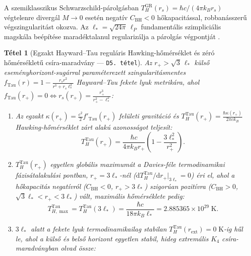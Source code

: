 \documentclass[11pt,a4paper]{article}
\newtheorem{theorem}{T\'etel}[section]
\theoremstyle{remark}
\begin{document}
A szemiklasszikus Schwarzschild-p\'arolg\'asban $T_H^{\mathrm{GR}}(r_s) = \hbar c/(4\pi k_B r_s)$ v\'egtelenre diverg\'al $M \to 0$ eset\'en negat\'iv $C_{\mathrm{BH}} < 0$ h\H{o}kapacit\'assal, robban\'asszer\H{u} v\'egszingularit\'ast okozva. Az $\ell_* = \sqrt{24\pi}\,\ell_P$ fundament\'alis szimplici\'alis magsk\'ala be\'ep\'it\'ese marad\'ektalanul regulariz\'alja a p\'arolg\'as v\'egpontj\'at \cite{Hayward2006RegularBH,Davies1977Phase}.

\begin{theorem}[Egzakt Hayward--Tau regul\'aris Hawking-h\H{o}m\'ers\'eklet \'es z\'er\'o h\H{o}m\'ers\'eklet\H{u} cs\'ira-maradv\'any --- \texttt{D5.\ t\'etel}]
\label{thm:d5}
Az $r_+ > \sqrt{3}\,\ell_*$ k\"uls\H{o} esem\'enyhorizont-sug\'arral param\'eterezett szingularit\'asmentes $f_{\mathrm{Tau}}(r) = 1 - \frac{r_s r^2}{r^3 + r_s \ell_*^2}$ Hayward--Tau fekete lyuk metrik\'ara, ahol $f_{\mathrm{Tau}}(r_+) = 0 \iff r_s(r_+) = \frac{r_+^3}{r_+^2 - \ell_*^2}$:
\begin{enumerate}
  \item Az egzakt $\kappa(r_+) = \frac{c^2}{2}f'_{\mathrm{Tau}}(r_+)$ fel\"uleti gravit\'aci\'o \'es $T_H^{\mathrm{Tau}}(r_+) = \frac{\hbar\kappa(r_+)}{2\pi c k_B}$ Hawking-h\H{o}m\'ers\'eklet z\'art alak\'u azonoss\'agot teljes\'it:
  \begin{equation}
    T_H^{\mathrm{Tau}}(r_+) = \frac{\hbar c}{4\pi k_B r_+}\!\left(1 - \frac{3\ell_*^2}{r_+^2}\right).
    \label{eq:t_hawking_tau}
  \end{equation}
  \item $T_H^{\mathrm{Tau}}(r_+)$ egyetlen glob\'alis maximum\'at a Davies-f\'ele termodinamikai f\'azis\'atalakul\'asi pontban, $r_+ = 3\ell_*$-n\'el ($\mathrm{d}T_H^{\mathrm{Tau}}/\mathrm{d}r_+|_{3\ell_*} = 0$) \'eri el, ahol a h\H{o}kapacit\'as negat\'ivr\'ol ($C_{\mathrm{BH}} < 0$, $r_+ > 3\ell_*$) szigor\'uan pozit\'ivra ($C_{\mathrm{BH}} > 0$, $\sqrt{3}\ell_* < r_+ < 3\ell_*$) v\'alt, maxim\'alis h\H{o}m\'ers\'eklete pedig:
  \begin{equation}
    T_{H,\max}^{\mathrm{Tau}} = T_H^{\mathrm{Tau}}(3\ell_*) = \frac{\hbar c}{18\pi k_B \ell_*} = 2.885365 \times 10^{29}\;\mathrm{K}.
    \label{eq:t_hawking_max}
  \end{equation}
  \item $3\ell_*$ alatt a fekete lyuk termodinamikailag stabilan $T_H^{\mathrm{Tau}}(r_{\mathrm{ext}}) = 0\;\mathrm{K}$-ig h\H{u}l le, ahol a k\"uls\H{o} \'es bels\H{o} horizont egyetlen stabil, hideg extrem\'alis $K_4$ cs\'ira-maradv\'anyban olvad \"ossze:

\end{enumerate}
\end{theorem}
\end{document}
